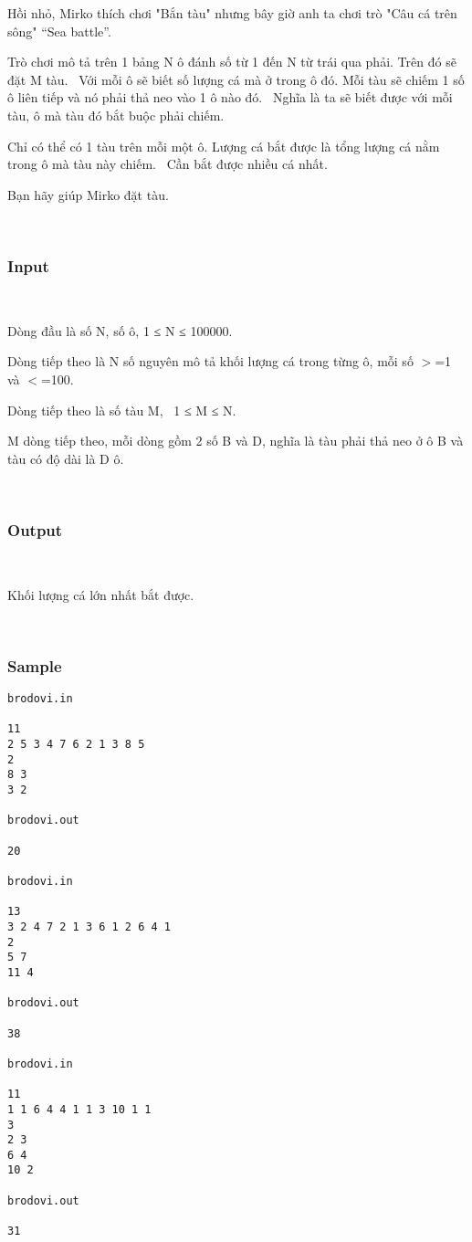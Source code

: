 

Hồi nhỏ, Mirko thích chơi "Bắn tàu" nhưng bây giờ anh ta chơi trò "Câu cá trên sông" “Sea battle”.

Trò chơi mô tả trên 1 bảng N ô đánh số từ 1 đến N từ trái qua phải. Trên đó sẽ đặt M tàu.  Với mỗi ô sẽ biết số lượng cá mà ở trong ô đó. Mỗi tàu sẽ chiếm 1 số ô liên tiếp và nó phải thả neo vào 1 ô nào đó.  Nghĩa là ta sẽ biết được với mỗi tàu, ô mà tàu đó bắt buộc phải chiếm.

Chỉ có thể có 1 tàu trên mỗi một ô. Lượng cá bắt được là tổng lượng cá nằm trong ô mà tàu này chiếm.  Cần bắt được nhiều cá nhất.

Bạn hãy giúp Mirko đặt tàu.

 

\subsubsection{Input}

 

Dòng đầu là số N, số ô, 1 ≤ N ≤ 100000.

Dòng tiếp theo là N số nguyên mô tả khối lượng cá trong từng ô, mỗi số $>$=1 và $<$=100.

Dòng tiếp theo là số tàu M,  1 ≤ M ≤ N.

M dòng tiếp theo, mỗi dòng gồm 2 số B và D, nghĩa là tàu phải thả neo ở ô B và tàu có độ dài là D ô.

 

\subsubsection{Output}

 

Khối lượng cá lớn nhất bắt được.

 

\subsubsection{Sample}
\begin{verbatim}
brodovi.in 
 
11 
2 5 3 4 7 6 2 1 3 8 5 
2 
8 3 
3 2 
 
brodovi.out 
 
20 

brodovi.in 
 
13 
3 2 4 7 2 1 3 6 1 2 6 4 1 
2 
5 7 
11 4 
 
brodovi.out 
 
38

brodovi.in 
 
11 
1 1 6 4 4 1 1 3 10 1 1 
3 
2 3 
6 4 
10 2 
 
brodovi.out 
 
31 
\end{verbatim}

 